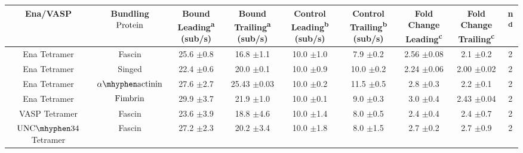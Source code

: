 \begin{table}[hbtp]
\centering 
\begin{tabulary}{1.0\textwidth}{C C C C C C C C C}
\toprule Ena\slash VASP & Bundling ${\textup{Protein}}$ & Bound Leading\textsuperscript{a} (sub/s) & Bound Trailing\textsuperscript{a} (sub/s) & Control Leading\textsuperscript{b} (sub/s) &  Control Trailing\textsuperscript{b} (sub/s)  &  Fold Change Leading\textsuperscript{c} & Fold Change Trailing\textsuperscript{c} & n\textsuperscript{d} \\ \midrule 
Ena Tetramer & Fascin & 25.6 $\pm$0.8 & 16.8 $\pm$1.1 & 10.0\hspace{0.1cm} $\pm$1.0 & 7.9\hspace{0.3cm} $\pm$0.2 & 2.56 $\pm$0.08 & 2.1\hspace{0.1cm} $\pm$0.2 & 2 \\ 
Ena Tetramer & Singed & 22.4 $\pm$0.6 & 20.0 $\pm$0.1 & 10.0\hspace{0.1cm} $\pm$0.9 & 10.0\hspace{0.1cm} $\pm$0.2 & 2.24 $\pm$0.06 & 2.00 $\pm$0.02 & 2 \\ 
Ena Tetramer & ${\alpha\mhyphen\textup{actinin}}$ & 27.6 $\pm$2.7 & 25.43 $\pm$0.03 & 10.0\hspace{0.1cm} $\pm$0.2 & 11.5\hspace{0.1cm} $\pm$0.5 & 2.8\hspace{0.1cm} $\pm$0.3 & 2.2\hspace{0.1cm} $\pm$0.1 & 2 \\
Ena Tetramer & ${\textup{Fimbrin}}$ & 29.9 $\pm$3.7 & 21.9 $\pm$1.0 & 10.0\hspace{0.1cm} $\pm$0.1 & 9.0\hspace{0.3cm} $\pm$0.3 & 3.0\hspace{0.1cm} $\pm$0.4 & 2.43 $\pm$0.04 & 2 \\
VASP Tetramer & Fascin & 23.6 $\pm$3.9 & 18.8 $\pm$4.6 & 10.0\hspace{0.1cm} $\pm$1.4 & 8.0\hspace{0.3cm} $\pm$0.5 & 2.4\hspace{0.1cm} $\pm$0.4 & 2.4\hspace{0.1cm} $\pm$0.7 & 2 \\
${\textup{UNC}\mhyphen34}$ Tetramer & Fascin & 27.2 $\pm$2.3 & 20.2 $\pm$3.4 & 10.0\hspace{0.1cm} $\pm$1.8 & 8.0\hspace{0.3cm} $\pm$1.5 & 2.7\hspace{0.1cm} $\pm$0.2 & 2.7\hspace{0.1cm} $\pm$0.9 & 2 \\

\end{tabulary}
\end{table}
